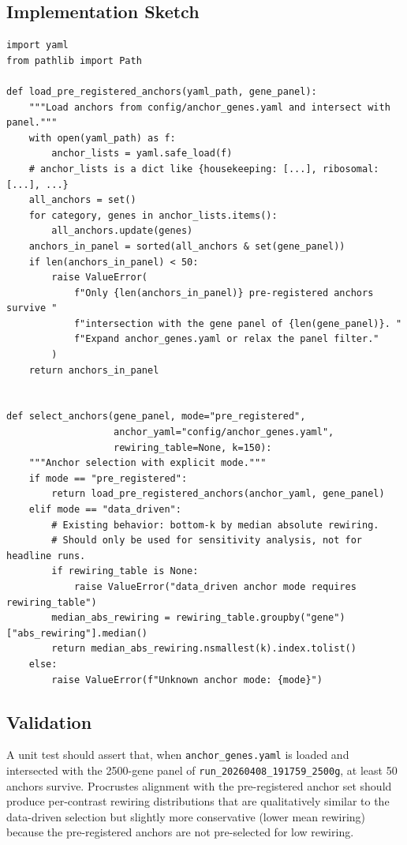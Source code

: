 \documentclass[11pt]{article}
\newcommand{\code}[1]{\texttt{#1}}
\begin{document}
\subsection{Implementation Sketch}

\begin{lstlisting}[style=pythonstyle,caption={Anchor selection with --anchor-mode flag.}]
import yaml
from pathlib import Path

def load_pre_registered_anchors(yaml_path, gene_panel):
    """Load anchors from config/anchor_genes.yaml and intersect with panel."""
    with open(yaml_path) as f:
        anchor_lists = yaml.safe_load(f)
    # anchor_lists is a dict like {housekeeping: [...], ribosomal: [...], ...}
    all_anchors = set()
    for category, genes in anchor_lists.items():
        all_anchors.update(genes)
    anchors_in_panel = sorted(all_anchors & set(gene_panel))
    if len(anchors_in_panel) < 50:
        raise ValueError(
            f"Only {len(anchors_in_panel)} pre-registered anchors survive "
            f"intersection with the gene panel of {len(gene_panel)}. "
            f"Expand anchor_genes.yaml or relax the panel filter."
        )
    return anchors_in_panel


def select_anchors(gene_panel, mode="pre_registered",
                   anchor_yaml="config/anchor_genes.yaml",
                   rewiring_table=None, k=150):
    """Anchor selection with explicit mode."""
    if mode == "pre_registered":
        return load_pre_registered_anchors(anchor_yaml, gene_panel)
    elif mode == "data_driven":
        # Existing behavior: bottom-k by median absolute rewiring.
        # Should only be used for sensitivity analysis, not for headline runs.
        if rewiring_table is None:
            raise ValueError("data_driven anchor mode requires rewiring_table")
        median_abs_rewiring = rewiring_table.groupby("gene")["abs_rewiring"].median()
        return median_abs_rewiring.nsmallest(k).index.tolist()
    else:
        raise ValueError(f"Unknown anchor mode: {mode}")
\end{lstlisting}

\subsection{Validation}

A unit test should assert that, when \code{anchor\_genes.yaml} is loaded and intersected with the 2500-gene panel of \code{run\_20260408\_191759\_2500g}, at least 50 anchors survive. Procrustes alignment with the pre-registered anchor set should produce per-contrast rewiring distributions that are qualitatively similar to the data-driven selection but slightly more conservative (lower mean rewiring) because the pre-registered anchors are not pre-selected for low rewiring.
\end{document}
